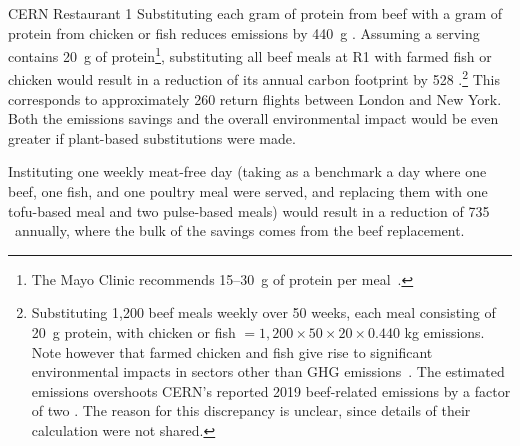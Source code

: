 \documentclass[../SustainableHEP.tex]{subfiles}
\begin{document}
\begin{casestudy}{CERN Restaurant 1}
    Substituting each gram of protein from beef with a gram of protein from chicken or fish reduces emissions by 440~g \CdOe.  
    Assuming a serving contains 20~g of protein\footnote{The Mayo Clinic recommends 15--30~g of protein per meal~\cite{MAYO}.}, substituting all beef meals at R1 with farmed fish or chicken would result in a reduction of its annual carbon footprint by 528 \tCdOe.\footnote{Substituting 1,200 beef meals weekly over 50 weeks, each meal consisting of 20~g protein, with chicken or fish $= 1,200\times 50\times 20\times 0.440$ kg \CdOe \; emissions. Note however that farmed chicken and fish give rise to significant environmental impacts in sectors other than GHG emissions~\cite{KUEMPEL2023}.  The estimated emissions overshoots CERN's reported 2019 beef-related emissions by a factor of two \cite{HSENote}.  The reason for this discrepancy is unclear, since details of their calculation were not shared.}
    This corresponds to approximately  260 return flights between London and New York. 
    Both the emissions savings and the overall environmental impact would be even greater if plant-based substitutions were made.

    Instituting one weekly meat-free day (taking as a benchmark a day where one beef, one fish, and one poultry meal were served, and replacing them with one tofu-based meal and two pulse-based meals) would result in a reduction of 735 \tCdOe\ annually, where the bulk of the savings comes from the beef replacement.
\end{casestudy}
\end{document}
